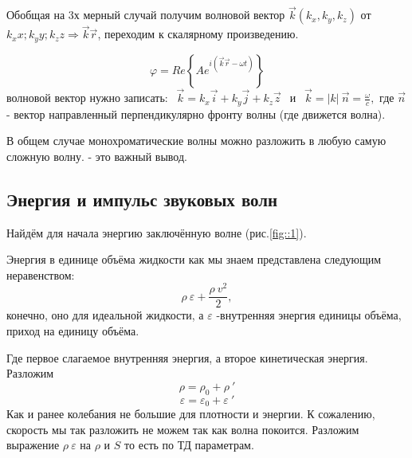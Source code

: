 \documentclass[14pt,a4paper,oneside]{extarticle}	%
\newcommand{\bracket}[1] {\left( #1 \right) } %
\begin{document}
Обобщая на 3х  мерный случай получим волновой вектор $ \vec{k}(k_{x},k_{y},k_{z}) $ от $ k_{x}x; k_{y}y; k_{z}z \Rightarrow \vec{k}\vec{r} $, переходим к скалярному произведению.

\begin{equation*}
\varphi =  Re\left\lbrace Ae^{i\bracket{\vec{k}\vec{r} - \omega t}} \right\rbrace 
\end{equation*}
волновой вектор нужно записать: $\:\: \vec{k} = k_{x}\vec{i} + k_{y}\vec{j} + k_{z}\vec{z} \:\: $ и $\:\: \vec{k} = |k|\:\vec{n} = \frac{\omega}{c}, $
где $ \vec{n} $ - вектор направленный перпендикулярно фронту волны (где движется волна).

В общем случае монохроматические волны можно разложить в любую самую сложную волну. - это важный вывод.

\newpage
\begin{center}
	\subsection*{Энергия и импульс звуковых волн} %
\end{center}
Найдём для начала энергию заключённую волне (рис.\ref{fig::1}).

Энергия в единице объёма жидкости как мы знаем представлена следующим неравенством:
\begin{equation}\label{57}
\rho \: \varepsilon + \frac{\rho \: v^{2}}{2},
\end{equation}
 конечно, оно для идеальной жидкости, а $ \varepsilon $ -внутренняя энергия единицы объёма, приход на единицу объёма.
 
 Где первое слагаемое внутренняя энергия, а второе кинетическая энергия.
 Разложим 
\begin{equation*}
\rho = \rho_{0} +\rho\:'
\end{equation*}
\begin{equation*}
 \varepsilon =  \varepsilon_{0} + \varepsilon\:'
\end{equation*}
Как и ранее колебания не большие для плотности и энергии. К сожалению, скорость мы так разложить не можем так как волна покоится.
Разложим выражение  $ \rho\:\varepsilon $ на $ \rho $ и $ S $ то есть по ТД параметрам.
\end{document}
